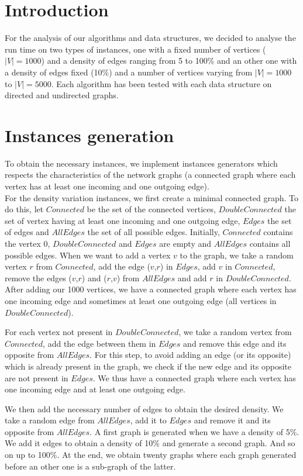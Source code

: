 \section{Introduction}
For the analysis of our algorithms and data structures, we decided to analyse the run time on two types of instances, one with a fixed number of vertices ($|V|=1000$) and a density of edges ranging from 5 to 100\% and an other one with a density of edges fixed (10\%) and a number of vertices varying from $|V|=1000$ to $|V|=5000$. Each algorithm has been tested with each data structure on directed and undirected graphs.

\section{Instances generation}
To obtain the necessary instances, we implement instances generators which respects the characteristics of the network graphs (a connected graph where each vertex has at least one incoming and one outgoing edge). \\

For the density variation instances, we first create a minimal connected graph. To do this, let $Connected$ be the set of the connected vertices, $DoubleConnected$ the set of vertex having at least one incoming and one outgoing edge, $Edges$ the set of edges and $AllEdges$ the set of all possible edges. Initially, $Connected$ contains the vertex 0, $DoubleConnected$ and $Edges$ are empty and $AllEdges$ contains all possible edges. When we want to add a vertex $v$ to the graph, we take a random vertex $r$ from $Connected$, add the edge ($v$,$r$) in $Edges$, add $v$ in $Connected$, remove the edges ($v$,$r$) and ($r$,$v$) from $AllEdges$ and add $r$ in $DoubleConnected$. After adding our 1000 vertices, we have a connected graph where each vertex has one incoming edge and sometimes at least one outgoing edge (all vertices in $DoubleConnected$).

For each vertex not present in $DoubleConnected$, we take a random vertex from $Connected$, add the edge between them in $Edges$ and remove this edge and its opposite from $AllEdges$. For this step, to avoid adding an edge (or its opposite) which is already present in the graph, we check if the new edge and its opposite are not present in $Edges$. We thus have a connected graph where each vertex has one incoming edge and at least one outgoing edge.

We then add the necessary number of edges to obtain the desired density. We take a random edge from $AllEdges$, add it to $Edges$ and remove it and its opposite from $AllEdges$. A first graph is generated when we have a density of 5\%. We add it edges to obtain a density of 10\% and generate a second graph. And so on up to 100\%. At the end, we obtain twenty graphs where each graph generated before an other one is a sub-graph of the latter.

